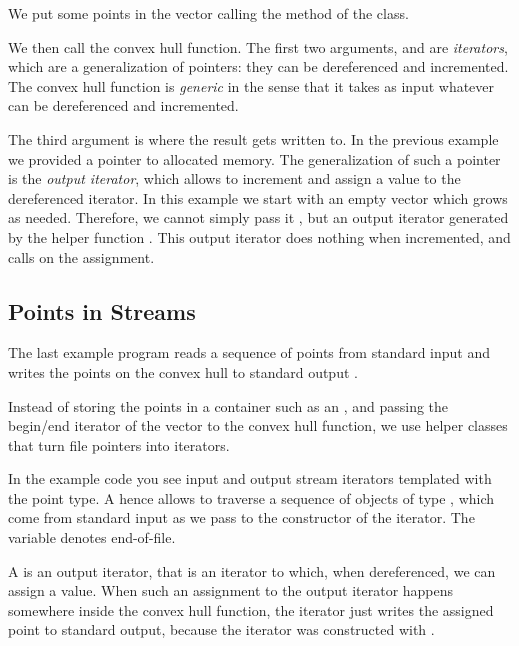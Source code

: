 
We put some points in the vector calling the 
method of the  class.

We then call the convex hull function. The first two arguments,
 and  are  {\em iterators}, 
which are a generalization of pointers:
they can be dereferenced and incremented. The convex hull
function is {\em generic} in the sense that it takes as
input whatever can be dereferenced and incremented.

The third argument is where the result gets written to.
In the previous example we provided a pointer to allocated memory.
The generalization of such a pointer is the {\em output iterator},
which allows to increment and assign a value to the dereferenced iterator.
In this example we start with an empty vector which grows as needed. 
Therefore, we cannot simply pass it , but
an output iterator generated by the helper function .
This output iterator does nothing when incremented,
and calls  on the assignment.



\subsection{Points in Streams}

The last example program reads a sequence of points from standard
input  and writes the points on the convex hull to
standard output .

Instead of storing the points in a container such as an
, and passing the begin/end iterator of the vector to
the convex hull function, we use helper classes that turn file
pointers into iterators.



In the example code you see input and output stream iterators
templated with the point type.  A 
hence allows to traverse a sequence of objects of type , which 
come from standard input as we pass  to the
constructor of the iterator. The variable  denotes
end-of-file.

A  is an output iterator,
that is an iterator to which, when dereferenced, we can assign a value. 
When such an assignment to the output iterator
happens somewhere inside the convex hull function, the iterator 
just writes the assigned point to standard output, because the iterator 
was  constructed with .

